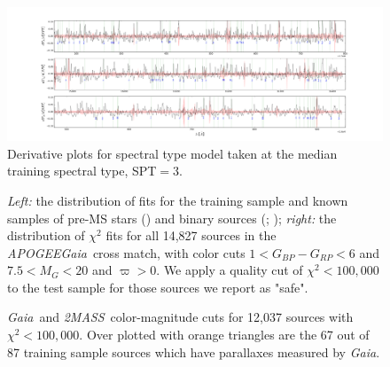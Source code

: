 \documentclass[modern]{aastex62}
\newcommand{\apogee}{\textsl{APOGEE}}
\newcommand{\gaia}{\textsl{Gaia}}
\newcommand{\zmass}{\textsl{2MASS}}
\begin{document}
\begin{figure}[ht]
\begin{center}
\includegraphics[width=16cm]{figures/derivative_jackknife_spt.png}
\end{center}
\caption{Derivative plots for spectral type model taken at the median training spectral type, SPT$=3$.} \label{fig:west_derivative}
\end{figure}


\begin{figure}[ht]
\caption{\textit{Left:} the distribution of fits for the training sample and known samples of pre-MS stars (\citealt{Cottaar:2014}) and binary sources (\citealt{ElBadry:2018}; \citealt{Skinner:2018}); \textit{right:} the distribution of $\chi^2$ fits for all 14,827 sources in the \apogee\-\gaia\ cross match, with color cuts $1<G_{BP}-G_{RP}<6$ and $7.5<M_{G}<20$ and $\varpi>0$. We apply a quality cut of $\chi^2 < 100,000$ to the test sample for those sources we report as "safe". \label{fig:chi_dist}}
\end{figure}

\begin{figure}[ht]
\caption{\gaia\ and \zmass\ color-magnitude cuts for 12,037 sources with $\chi^2<100,000$. Over plotted with orange triangles are the 67 out of 87 training sample sources which have parallaxes measured by \gaia. \label{fig:cmd_selection}}
\end{figure}
\end{document}
